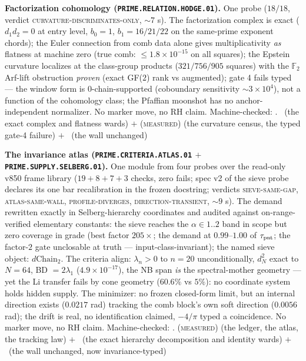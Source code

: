 \documentclass[11pt,a4paper]{article}
\theoremstyle{definition}
\begin{document}
\par\smallskip\noindent\textbf{Factorization cohomology
(\texttt{PRIME.RELATION.HODGE.01}).}
One probe ($18/18$, verdict
\textsc{curvature-discriminates-only}, ${\sim}7$ s).  The
factorization complex is exact ($d_1 d_2 = 0$ at entry level,
$b_0 = 1$, $b_1 = 16/21/22$ on the same-prime exponent chords);
the Euler connection from comb data alone gives multiplicativity
\emph{as} flatness at machine zero (true comb: $\le
1.8\times10^{-15}$ on all squares); the Epstein curvature
localizes at the class-group products ($321/756/905$ squares)
with the $\mathbb{F}_2$ Arf-lift obstruction \emph{proven} (exact
GF($2$) rank vs augmented); gate 4 fails typed --- the window
form is $0$-chain-supported (coboundary sensitivity $\sim
3\times10^{4}$), not a function of the cohomology class; the
Pfaffian moonshot has no anchor-independent normalizer.  No
marker move, no RH claim.
Machine-checked: .
\mE\ (the exact complex and flatness wards) $+$
(\textsc{measured}) (the curvature census, the typed gate-4
failure) $+$ \mO\ (the wall unchanged)
\par\smallskip

\par\smallskip\noindent\textbf{The invariance atlas
(\texttt{PRIME.CRITERIA.ATLAS.01} $+$
\texttt{PRIME.SUPPLY.SELBERG.01}).}
One module from four probes over the read-only v850 frame
library ($19 + 8 + 7 + 3$ checks, zero fails; spec v2 of the
sieve probe declares its one bar recalibration in the frozen
docstring; verdicts \textsc{sieve-same-gap},
\textsc{atlas-same-wall}, \textsc{profile-diverges},
\textsc{direction-transient}, ${\sim}9$ s).  The demand
rewritten exactly in Selberg-hierarchy coordinates and audited
against on-range-verified elementary constants: the sieve
reaches the $\alpha \in 1..2$ band in scope but zero coverage in
grade (best factor $205\times$; the demand at $0.99$--$1.00$ of
$\tau_{\rm pnt}$; the factor-$2$ gate unclosable at truth ---
input-class-invariant); the named sieve object:
$d\mathrm{Chain}_2$.  The criteria align: $\lambda_n > 0$ to
$n = 20$ unconditionally, $d_N^2$ exact to $N = 64$, BD $=
2\lambda_1$ ($4.9\times10^{-17}$), the NB span \emph{is} the
spectral-mother geometry --- yet the Li transfer fails by cone
geometry ($60.6\%$ vs $5\%$): no coordinate system holds hidden
supply.  The minimizer: no frozen closed-form limit, but an
internal direction exists ($0.0217$ rad) tracking the comb
block's own soft direction ($0.0056$ rad); the drift is real, no
identification claimed, $-4/\pi$ typed a coincidence.  No marker
move, no RH claim.
Machine-checked: .
(\textsc{measured}) (the ledger, the atlas, the tracking law)
$+$ \mE\ (the exact hierarchy decomposition and identity wards)
$+$ \mO\ (the wall unchanged, now invariance-typed)
\par\smallskip
\end{document}
